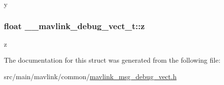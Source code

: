 y 

\hypertarget{struct____mavlink__debug__vect__t_a8fdd83fc7a64d6a8200dea9dddf58ee9}{
\subsubsection[{z}]{\setlength{\rightskip}{0pt plus 5cm}float \+\_\+\+\_\+mavlink\+\_\+debug\+\_\+vect\+\_\+t\+::z}}\label{struct____mavlink__debug__vect__t_a8fdd83fc7a64d6a8200dea9dddf58ee9}


z 



The documentation for this struct was generated from the following file\+:\begin{DoxyCompactItemize}
\item 
src/main/mavlink/common/\hyperlink{mavlink__msg__debug__vect_8h}{mavlink\+\_\+msg\+\_\+debug\+\_\+vect.\+h}\end{DoxyCompactItemize}
